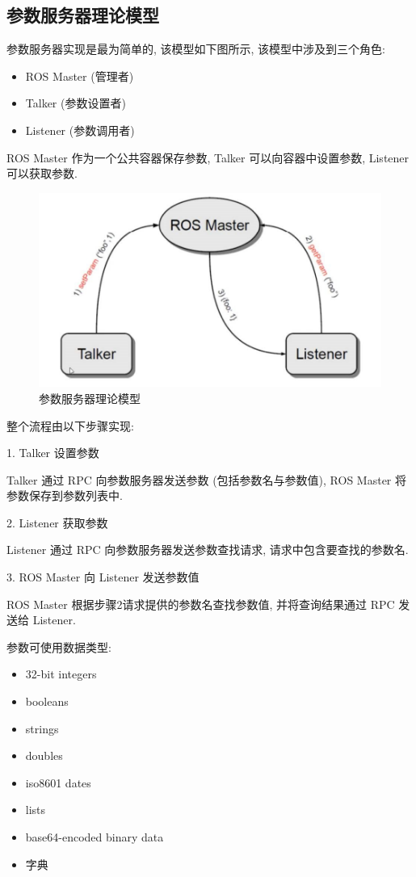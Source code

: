 \documentclass[openany, fontset=windowsold]{ctexbook}
\theoremstyle{kaiti}
\theoremstyle{normal}
\begin{document}
\subsection{参数服务器理论模型}

参数服务器实现是最为简单的, 该模型如下图所示, 该模型中涉及到三个角色:

\begin{itemize}
  \item ROS Master (管理者)
  \item Talker (参数设置者)
  \item Listener (参数调用者)
\end{itemize}

ROS Master 作为一个公共容器保存参数, Talker 可以向容器中设置参数, Listener 可以获取参数.

\begin{figure}[!ht]
  \centering
  \includegraphics[width=.75\textwidth]{ros_param_server.jpg}
  \caption{参数服务器理论模型}
  \label{fig:ros_param_server}
\end{figure}

整个流程由以下步骤实现:

1. Talker 设置参数

Talker 通过 RPC 向参数服务器发送参数 (包括参数名与参数值), ROS Master 将参数保存到参数列表中.

2. Listener 获取参数

Listener 通过 RPC 向参数服务器发送参数查找请求, 请求中包含要查找的参数名.

3. ROS Master 向 Listener 发送参数值

ROS Master 根据步骤2请求提供的参数名查找参数值, 并将查询结果通过 RPC 发送给 Listener.

参数可使用数据类型:

\begin{itemize}
  \item 32-bit integers
  \item booleans
  \item strings
  \item doubles
  \item iso8601 dates
  \item lists
  \item base64-encoded binary data
  \item 字典
\end{itemize}
\end{document}
